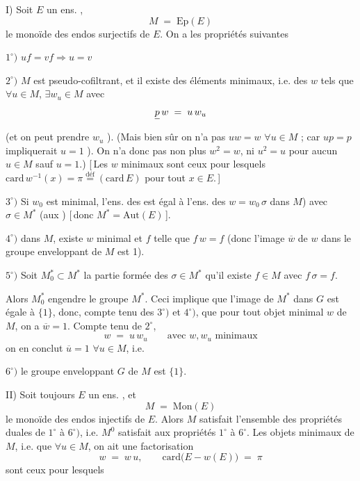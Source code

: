 \documentclass[11pt,a4paper]{article}
\begin{document}

I) Soit $E$ un ens. ,
\[
  M \;=\; \mathrm{Ep}(E)
\]
le monoïde des endos surjectifs de $E$. On a les propriétés suivantes

$1^{\circ})$ $uf = vf \Longrightarrow u = v$

$2^{\circ})$ $M$ est pseudo-cofiltrant, et \struck{$=$} il existe des éléments
minimaux, i.e. des \struck{\ill{}} $w$ tels que $\forall u \in M$, $\exists
w_u \in M$ avec
\[
  \struck{p}\, w \;=\; u\, w_u
\]
(et on peut \struck{$=$} prendre $w_u$ ). (Mais bien sûr on n'a
pas \struck{\ill{}} $uw = w$ $\forall u \in M$ ; car $up = p$ impliquerait
$u = 1$ \ill{}). On n'a donc pas non plus $w^2 = w$, ni $u^2 = u$ pour aucun
$u \in M$ sauf $u = 1$.) [\,Les $w$ minimaux sont ceux pour lesquels
$\mathrm{card}\, w^{-1}(x) = \pi \overset{\text{déf}}{=} (\mathrm{card}\, E)$
pour tout $x \in E$.\,]

$3^{\circ})$ Si $w_0$ est \ill{} minimal, l'ens. des \ill{} \ill{} est égal à
l'ens. des $w = w_0\,\sigma$ \ill{} \ill{} dans $M$) \ill{} avec
$\sigma \in M^{*}$ (aux \ill{}  \ill{})
[\,donc $M^{*} = \mathrm{Aut}(E)$\,].

$4^{\circ})$ \ill{} dans $M$, \ill{} existe $w$ minimal et $f$ telle que
$f\,w = f$ (donc l'image $\overline{w}$ de $w$ dans le groupe enveloppant 
de $M$ est 1).

$5^{\circ})$ Soit $M^{*}_0 \subset M^{*}$ \struck{\ill{}} la partie formée des
$\sigma \in M^{*}$  qu'il existe $f \in M$ avec
$f\,\sigma = f$.


Alors $M^{*}_0$ engendre le groupe $M^{*}$. Ceci implique que
\struck{\ill{}} l'image de $M^{*}$ dans $G$ est égale à $\{1\}$, donc, compte
tenu des $3^{\circ})$ et $4^{\circ})$, que pour tout objet minimal $w$ de $M$,
on a $\overline{w} = 1$. Compte tenu de $2^{\circ}$,
\[
  w \;=\; u\, w_u \qquad \text{avec } w, w_u \text{ minimaux}
\]
on en conclut $\overline{u} = 1$ $\forall u \in M$, i.e.

$6^{\circ})$ le \struck{\ill{}} groupe enveloppant $G$ de $M$ est $\{1\}$.

II) Soit toujours $E$ un ens. , et
\[
  M \;=\; \mathrm{Mon}(E)
\]
le monoïde des endos injectifs de $E$. Alors $M$ satisfait l'ensemble des
\struck{\ill{}} propriétés duales  de $1^{\circ}$ à $6^{\circ})$,
i.e. $M^0$ satisfait aux propriétés $1^{\circ}$ à $6^{\circ}$. Les objets
minimaux  de $M$, i.e.   que
$\forall u \in M$, on ait une factorisation
\[
  w \;=\; w\, u , \qquad
  \mathrm{card}\bigl(E - w(E)\bigr) \;=\; \pi
\]
sont ceux pour lesquels \ill{}
\end{document}
